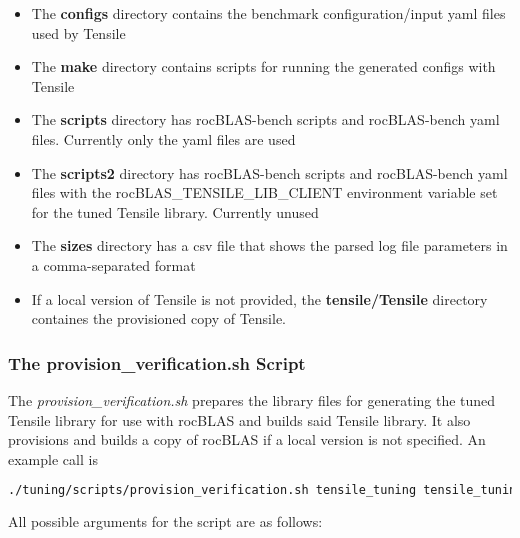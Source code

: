 \documentclass[]{article}
\begin{document}
\begin{itemize}


 \item The \textbf{configs} directory contains the benchmark configuration/input yaml files used by Tensile

 \item The \textbf{make} directory contains scripts for running the generated configs with Tensile

 \item The \textbf{scripts} directory has rocBLAS-bench scripts and rocBLAS-bench yaml files. Currently only the yaml files are used

 \item The \textbf{scripts2} directory has rocBLAS-bench scripts and rocBLAS-bench yaml files with the rocBLAS\_TENSILE\_LIB\_CLIENT environment variable set for the tuned Tensile library. Currently unused

 \item The \textbf{sizes} directory has a csv file that shows the parsed log file parameters in a comma-separated format

 \item If a local version of Tensile is not provided, the \textbf{tensile/Tensile} directory containes the provisioned copy of Tensile.

\end{itemize}

\subsubsection{The provision\_verification.sh Script}

The \emph{provision\_verification.sh} prepares the library files for generating the tuned Tensile library for use with rocBLAS and builds said Tensile library. It also provisions and builds a copy of rocBLAS if a local version is not specified. An example call is

\begin{lstlisting}[language=bash,breaklines=true]
./tuning/scripts/provision_verification.sh tensile_tuning tensile_tuning/tensile/Tensile vega20
\end{lstlisting}

\noindent
All possible arguments for the script are as follows:
\end{document}
